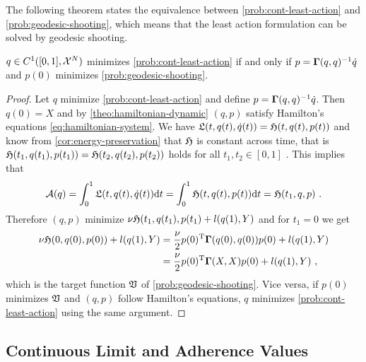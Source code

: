 The following theorem states the equivalence between \cref{prob:cont-least-action} and \cref{prob:geodesic-shooting}, which means that the least action formulation can be solved by geodesic shooting.
\begin{theorem}
	\label{theo:geodesic-shooting}
	$q \in C^1([0, 1], \mathcal{X}^N)$ minimizes \cref{prob:cont-least-action} if and only if $p = \mathbf{\Gamma}(q, q)^{-1}\dot{q}$ and $p(0)$ minimizes \cref{prob:geodesic-shooting}.
\end{theorem}
\begin{proof}
	Let $q$ minimize \cref{prob:cont-least-action} and define $p = \mathbf{\Gamma}(q, q)^{-1}\dot{q}$.
	Then $q(0) = X$ and by \cref{theo:hamiltonian-dynamic} $(q, p)$ satisfy Hamilton's equations \ref{eq:hamiltonian-system}.
	We have $\mathfrak{L}(t, q(t), \dot{q}(t)) = \mathfrak{H}(t, q(t), p(t))$ and know from \cref{cor:energy-preservation} that $\mathfrak{H}$ is constant across time, that is $\mathfrak{H}(t_1, q(t_1), p(t_1)) = \mathfrak{H}(t_2, q(t_2), p(t_2))$ holds for all $t_1, t_2 \in [0, 1]$ .
	This implies that
	\begin{equation}
	\mathcal{A}(q) = \int_{0}^{1} \fL(t, q(t), \dot{q}(t)) \mathrm{d}t 
	= \int_{0}^{1} \fH(t, q(t), p(t)) \mathrm{d}t = \fH(t_1, q, p) \ .
	\end{equation}
	Therefore $(q, p)$ minimize $\nu \mathfrak{H}(t_1, q(t_1), p(t_1) + l(q(1), Y)$ and for $t_1 = 0$ we get
	\begin{align}
	\nu \mathfrak{H}(0, q(0), p(0)) + l(q(1), Y) &= \frac{\nu}{2} p(0)^{\mathrm{T}} \mathbf{\Gamma}(q(0), q(0))p(0) + l(q(1), Y)\\
	&= \frac{\nu}{2} p(0)^{\mathrm{T}} \mathbf{\Gamma}(X, X)p(0) + l(q(1), Y) \ ,
	\end{align}
	which is the target function $\mathfrak{V}$ of \cref{prob:geodesic-shooting}.
	Vice versa, if $p(0)$ minimizes $\mathfrak{V}$ and $(q, p)$ follow Hamilton's equations, $q$ minimizes \cref{prob:cont-least-action} using the same argument.
\end{proof}

\subsection{Continuous Limit and Adherence Values}

